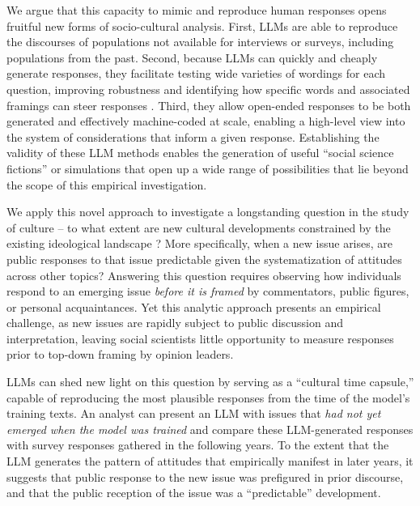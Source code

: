 \documentclass{article}
\begin{document}
We argue that this capacity to mimic and reproduce human responses opens
fruitful new forms of socio-cultural analysis. First, LLMs are able to
reproduce the discourses of populations not available for interviews or
surveys, including populations from the past. Second, because LLMs can
quickly and cheaply generate responses, they facilitate testing wide
varieties of wordings for each question, improving robustness and
identifying how specific words and associated framings can steer
responses \parencite{Garcia-Pardina2022-cx}. Third, they allow open-ended responses to be both generated
and effectively machine-coded at scale, enabling a high-level view into
the system of considerations that inform a given response. Establishing
the validity of these LLM methods enables the generation of useful
``social science fictions'' or simulations that open up a wide range of
possibilities that lie beyond the scope of this empirical investigation.

We apply this novel approach to investigate a longstanding question in
the study of culture -- to what extent are new cultural developments
constrained by the existing ideological landscape
\parencite{Converse1964-kv, DellaPosta2020-ta, Hunzaker2019-ds}? More specifically, when
a new issue arises, are public responses to that issue predictable given
the systematization of attitudes across other topics? Answering this
question requires observing how individuals respond to an emerging issue
\emph{before it is framed} by commentators, public figures, or personal
acquaintances. Yet this analytic approach presents an empirical
challenge, as new issues are rapidly subject to public discussion and
interpretation, leaving social scientists little opportunity to measure
responses prior to top-down framing by opinion leaders.

LLMs can shed new light on this question by serving as a ``cultural time
capsule,'' capable of reproducing the most plausible responses from the
time of the model's training texts. An analyst can present an LLM with
issues that \emph{had not yet emerged when the model was trained} and
compare these LLM-generated responses with survey responses gathered in
the following years. To the extent that the LLM generates the pattern of
attitudes that empirically manifest in later years, it suggests that
public response to the new issue was prefigured in prior discourse, and
that the public reception of the issue was a ``predictable''
development.
\end{document}
